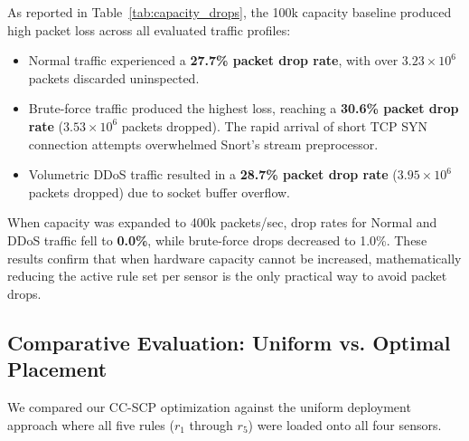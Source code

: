 \documentclass[conference]{IEEEtran}
\begin{document}
As reported in Table~\ref{tab:capacity_drops}, the 100k capacity baseline produced high packet loss across all evaluated traffic profiles:
\begin{itemize}
    \item Normal traffic experienced a \textbf{27.7\% packet drop rate}, with over $3.23 \times 10^6$ packets discarded uninspected.
    \item Brute-force traffic produced the highest loss, reaching a \textbf{30.6\% packet drop rate} ($3.53 \times 10^6$ packets dropped). The rapid arrival of short TCP SYN connection attempts overwhelmed Snort's stream preprocessor.
    \item Volumetric DDoS traffic resulted in a \textbf{28.7\% packet drop rate} ($3.95 \times 10^6$ packets dropped) due to socket buffer overflow.
\end{itemize}

When capacity was expanded to 400k packets/sec, drop rates for Normal and DDoS traffic fell to \textbf{0.0\%}, while brute-force drops decreased to 1.0\%. These results confirm that when hardware capacity cannot be increased, mathematically reducing the active rule set per sensor is the only practical way to avoid packet drops.

\begin{table}[t]
\caption{Packet Drop Rates across Traffic Regimes under 100k vs 400k Capacity Allocations}
\label{tab:capacity_drops}
\centering
{}
\end{table}

\subsection{Comparative Evaluation: Uniform vs. Optimal Placement}
We compared our CC-SCP optimization against the uniform deployment approach where all five rules ($r_1$ through $r_5$) were loaded onto all four sensors.
\end{document}
